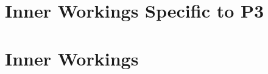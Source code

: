 \section{Inner Workings Specific to P3}

\begin{comment}
It is important to note that hBOA and LTGA were tuned specifically
to find the global optimum and are not necessarily using the optimal population size for finding intermediate fitnesses. Consider
that for both reducing the population size would almost certainly improve their fitness for evaluation steps less than their population
size. To examine the effect of population size we tested LTGA using one tenth of the population size required for reliably finding the
global optimum, with the results given in Figure~\ref{fig-small-pop}.
Reducing the population size resulted in LTGA's initial fitness improvement
occurring earlier, as the first generation is completed much more quickly. On Deceptive Step Trap this means that
LTGA leaps ahead of P3 due to its ability to overcome the two bit fitness plateaus.
%
Across all tested problems using the smaller
population size reduced the quality of LTGA's first fitness plateau, likely due to missing required diversity to reach higher quality.
The second period of improvement also comes earlier and reaches a lower quality fitness. On Deceptive Step Trap 0
runs reach the global optimum, down from 100 successful for the full population size. On Nearest Neighbor NK this drops the number
of successful runs from 98 to 68. As a result we conclude that while reducing the population size of LTGA may improve its quality
at early points during optimization, doing so reduces the robustness of the final solution found. This is in contrast to P3
which balances high quality intermediate fitness without trading away eventual optimality.
\end{comment}

\section{Inner Workings}

